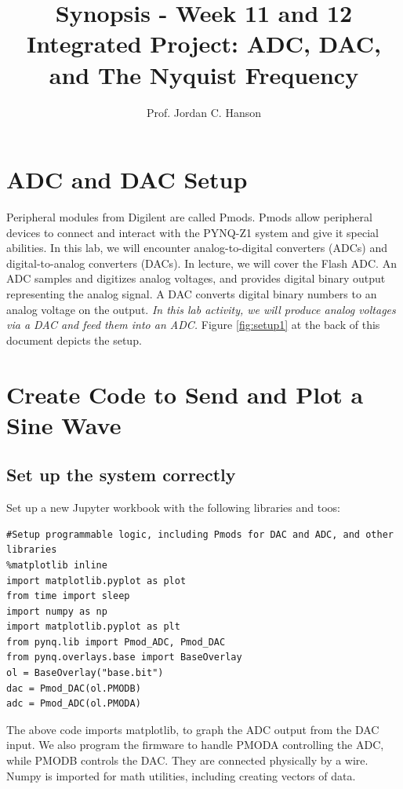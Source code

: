\documentclass{article}
\begin{document}
\title{Synopsis - Week 11 and 12 Integrated Project: ADC, DAC, and The Nyquist Frequency}
\author{Prof. Jordan C. Hanson}

\maketitle

\section{ADC and DAC Setup}

Peripheral modules from Digilent are called Pmods.  Pmods allow peripheral devices to connect and interact with the PYNQ-Z1 system and give it special abilities.  In this lab, we will encounter analog-to-digital converters (ADCs) and digital-to-analog converters (DACs).  In lecture, we will cover the Flash ADC.  An ADC samples and digitizes analog voltages, and provides digital binary output representing the analog signal.  A DAC converts digital binary numbers to an analog voltage on the output.  \textit{In this lab activity, we will produce analog voltages via a DAC and feed them into an ADC.}  Figure \ref{fig:setup1} at the back of this document depicts the setup.

\section{Create Code to Send and Plot a Sine Wave}

\subsection{Set up the system correctly}

Set up a new Jupyter workbook with the following libraries and toos:

\begin{verbatim}
#Setup programmable logic, including Pmods for DAC and ADC, and other libraries
%matplotlib inline
import matplotlib.pyplot as plot
from time import sleep
import numpy as np
import matplotlib.pyplot as plt
from pynq.lib import Pmod_ADC, Pmod_DAC
from pynq.overlays.base import BaseOverlay
ol = BaseOverlay("base.bit")
dac = Pmod_DAC(ol.PMODB)
adc = Pmod_ADC(ol.PMODA)
\end{verbatim}

The above code imports matplotlib, to graph the ADC output from the DAC input.  We also program the firmware to handle PMODA controlling the ADC, while PMODB controls the DAC.  They are connected physically by a wire.  Numpy is imported for math utilities, including creating vectors of data.
\end{document}
